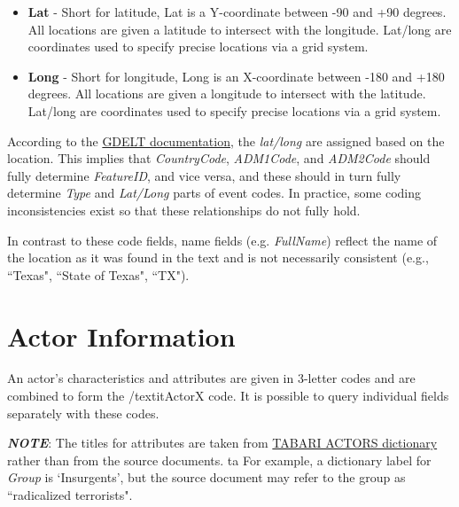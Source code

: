 \begin{itemize}
\item \textbf{Lat} - Short for latitude, Lat is a Y-coordinate between -90 and +90 degrees. All locations are given a latitude to intersect with the longitude. Lat/long are coordinates used to specify precise locations via a grid system. 

\item \textbf{Long} - Short for longitude, Long is an X-coordinate between -180 and +180 degrees. All locations are given a longitude to intersect with the latitude. Lat/long are coordinates used to specify precise locations via a grid system.
\end{itemize} 

According to the \href{http://data.gdeltproject.org/documentation/GDELT-Event_Codebook-V2.0.pdf}{GDELT documentation}, %
the \textit{lat/long} are assigned based on the location. This implies that \textit{CountryCode}, \textit{ADM1Code}, and \textit{ADM2Code} should fully determine \textit{FeatureID}, and vice versa, and these should in turn fully determine \textit{Type} and \textit{Lat/Long} parts of event codes. In practice, some coding inconsistencies exist so that these relationships do not fully hold.

In contrast to these code fields, name fields (e.g. \textit{FullName}) reflect the name of the location as it was found in the text and is not necessarily consistent (e.g., ``Texas", ``State of Texas", ``TX").

\section{Actor Information} 
An actor's characteristics and attributes are given in 3-letter codes and are combined to form the /textit{ActorX} code. %
It is possible to query individual fields separately with these codes.

\textbf{\textit{NOTE}}: The titles for attributes are taken from \href{https://github.com/openeventdata/tabari_dictionaries/blob/master/MNC.090831.actors.txt}{TABARI ACTORS dictionary} %
rather than from the source documents. ta
For example, a dictionary label for \textit{Group} is `Insurgents', but the source document may refer to the group as ``radicalized terrorists".

